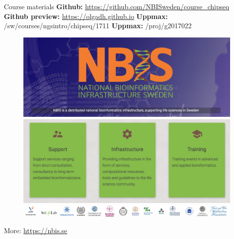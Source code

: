 \documentclass{beamer}\usepackage[]{graphicx}\usepackage[]{color}
\begin{document}
\begin{frame}[t]
\begin{block}{Course materials}
\small
\vspace{4mm}
\textbf{Github:} \hyperlink{https://github.com/NBISweden/course_chipseq}{https://github.com/NBISweden/course\_chipseq} \newline \newline
\textbf{Github preview:} \hyperlink{https://olgadh.github.io}{https://olgadh.github.io} \newline \newline
\textbf{Uppmax:} /sw/courses/ngsintro/chipseq/1711 \newline \newline
\textbf{Uppmax:} /proj/g2017022 
\end{block}
\end{frame}

\begin{frame}
\begin{figure}
   \includegraphics[scale=0.2]{../figures/lecture-welcome/NBIS-main.png}
   \hfill
   \vspace{5mm}
   \includegraphics[scale=0.3]{../figures/lecture-welcome/NBIS-3.png}
   \vspace{5mm}
   \includegraphics[scale=0.3]{../figures/lecture-welcome/NBIS-logos.png}
\end{figure}
\small
More: \hyperlink{https://nbis.se}{https://nbis.se}
\end{frame}
\end{document}
